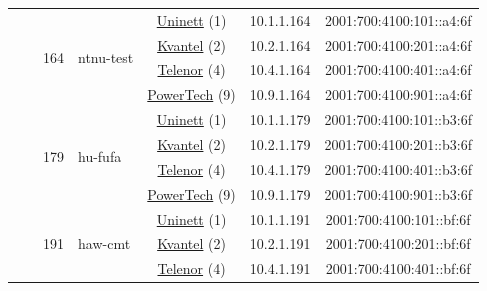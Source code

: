 \begin{small}
\begin{center}
\begin{longtable}{|c|c|c|c|c|c|c|c|}
  &  & \multirow{4}{*}{\tiny{164}} & \multicolumn{1}{|l|}{\multirow{4}{*}{\tiny{ntnu-test}}} & \multicolumn{2}{|c|}{\tiny{\href{https://www.uninett.no}{Uninett} (1)}} & \tiny{10.1.1.164} & \tiny{2001:700:4100:101::a4:6f} \\* \cline{5-5}\cline{6-6}\cline{7-7}\cline{8-8}
  &  &  &  & \multicolumn{2}{|c|}{\tiny{\href{http://kvantel.no}{Kvantel} (2)}} & \tiny{10.2.1.164} & \tiny{2001:700:4100:201::a4:6f} \\* \cline{5-5}\cline{6-6}\cline{7-7}\cline{8-8}
  &  &  &  & \multicolumn{2}{|c|}{\tiny{\href{https://www.telenor.no}{Telenor} (4)}} & \tiny{10.4.1.164} & \tiny{2001:700:4100:401::a4:6f} \\* \cline{5-5}\cline{6-6}\cline{7-7}\cline{8-8}
  &  &  &  & \multicolumn{2}{|c|}{\tiny{\href{http://www.powertech.no}{PowerTech} (9)}} & \tiny{10.9.1.164} & \tiny{2001:700:4100:901::a4:6f} \\* \cline{3-3}\cline{4-4}\cline{5-5}\cline{6-6}\cline{7-7}\cline{8-8}
  &  & \multirow{4}{*}{\tiny{179}} & \multicolumn{1}{|l|}{\multirow{4}{*}{\tiny{hu-fufa}}} & \multicolumn{2}{|c|}{\tiny{\href{https://www.uninett.no}{Uninett} (1)}} & \tiny{10.1.1.179} & \tiny{2001:700:4100:101::b3:6f} \\* \cline{5-5}\cline{6-6}\cline{7-7}\cline{8-8}
  &  &  &  & \multicolumn{2}{|c|}{\tiny{\href{http://kvantel.no}{Kvantel} (2)}} & \tiny{10.2.1.179} & \tiny{2001:700:4100:201::b3:6f} \\* \cline{5-5}\cline{6-6}\cline{7-7}\cline{8-8}
  &  &  &  & \multicolumn{2}{|c|}{\tiny{\href{https://www.telenor.no}{Telenor} (4)}} & \tiny{10.4.1.179} & \tiny{2001:700:4100:401::b3:6f} \\* \cline{5-5}\cline{6-6}\cline{7-7}\cline{8-8}
  &  &  &  & \multicolumn{2}{|c|}{\tiny{\href{http://www.powertech.no}{PowerTech} (9)}} & \tiny{10.9.1.179} & \tiny{2001:700:4100:901::b3:6f} \\* \cline{3-3}\cline{4-4}\cline{5-5}\cline{6-6}\cline{7-7}\cline{8-8}
  &  & \multirow{4}{*}{\tiny{191}} & \multicolumn{1}{|l|}{\multirow{4}{*}{\tiny{haw-cmt}}} & \multicolumn{2}{|c|}{\tiny{\href{https://www.uninett.no}{Uninett} (1)}} & \tiny{10.1.1.191} & \tiny{2001:700:4100:101::bf:6f} \\* \cline{5-5}\cline{6-6}\cline{7-7}\cline{8-8}
  &  &  &  & \multicolumn{2}{|c|}{\tiny{\href{http://kvantel.no}{Kvantel} (2)}} & \tiny{10.2.1.191} & \tiny{2001:700:4100:201::bf:6f} \\* \cline{5-5}\cline{6-6}\cline{7-7}\cline{8-8}
  &  &  &  & \multicolumn{2}{|c|}{\tiny{\href{https://www.telenor.no}{Telenor} (4)}} & \tiny{10.4.1.191} & \tiny{2001:700:4100:401::bf:6f} \\* \cline{5-5}\cline{6-6}\cline{7-7}\cline{8-8}

\end{longtable}
\end{center}
\end{small}
